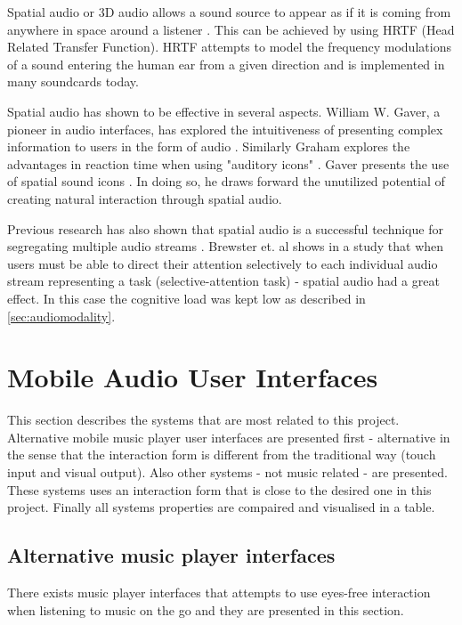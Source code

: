 Spatial audio or 3D audio allows a sound source to appear as if it is coming from anywhere in space around a listener \cite{begault_3dd_1994}. This can be achieved by using HRTF (Head Related Transfer Function). HRTF attempts to model the frequency modulations of a sound entering the human ear from a given direction and is implemented in many soundcards today.

Spatial audio has shown to be effective in several aspects. William W. Gaver, a pioneer in audio interfaces, has explored the intuitiveness of presenting complex information to users in the form of audio \cite{gaver_sonicfinder:_1989}. Similarly Graham explores the advantages in reaction time when using "auditory icons" \cite{graham_use_1999}. Gaver presents the use of spatial sound icons \cite{gaver_auditory_1986}. In doing so, he draws forward the unutilized potential of creating natural interaction through spatial audio.

Previous research has also shown that spatial audio is a successful technique for segregating multiple audio streams \cite{schmandt_audiostreamer:_1995, walker_spatial_2000}. Brewster et. al \cite{vazquez-alvarez_eyes-free_2011} shows in a study that when users must be able to direct their attention selectively to each individual audio stream representing a task (selective-attention task) - spatial audio had a great effect. In this case the cognitive load was kept low as described in \ref{sec:audiomodality}.





\section{Mobile Audio User Interfaces}
This section describes the systems that are most related to this project. Alternative mobile music player user interfaces are presented first - alternative in the sense that the interaction form is different from the traditional way (touch input and visual output). Also other systems - not music related - are presented. These systems uses an interaction form that is close to the desired one in this project. Finally all systems properties are compaired and visualised in a table.

\subsection{Alternative music player interfaces}
\label{sec:alternativemusicuis}
There exists music player interfaces that attempts to use eyes-free interaction when listening to music on the go and they are presented in this section.

